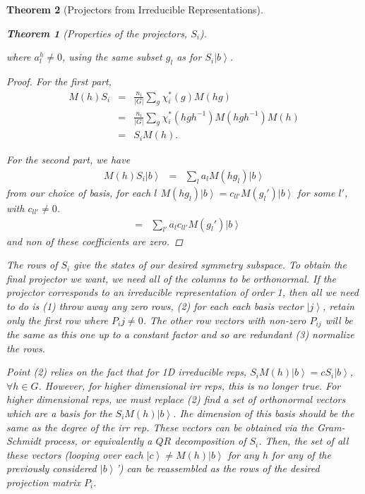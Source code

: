 \documentclass{article}
\newcommand{\ket}[1]{\left| #1 \right>} %
\newtheorem{theorem}{Theorem}[section]
\theoremstyle{definition}
\begin{document}
\begin{theorem}[Projectors from Irreducible Representations]
\begin{theorem}[Properties of the projectors, $S_i$]
\begin{enumerate}
where $a^h_l \neq 0$, using the same subset $g_l$ as for $S_i \ket{b}$.
\end{enumerate}
\end{theorem}
\begin{proof}

For the first part,
\begin{eqnarray}
M(h) S_i &=& \frac{n_i}{|G|} \sum_g \chi_i^*(g) M(hg)\\
&=& \frac{n_i}{|G|} \sum_g \chi_i^*(hgh^{-1}) M(hgh^{-1}) M(h)\\
&=& S_i M(h).
\end{eqnarray}

For the second part, we have
\begin{eqnarray}
M(h) S_i \ket{b} &=& \sum_l a_l M(h g_l) \ket{b}
\end{eqnarray}
from our choice of basis, for each $l$ $M(h g_l) \ket{b} = c_{ll'} M(g_l') \ket{b}$ for some $l'$, with $c_{ll'} \neq 0$.
\begin{eqnarray}
&=& \sum_{l'} a_l c_{ll'} M(g_l') \ket{b}
\end{eqnarray}
and non of these coefficients are zero.

\end{proof}

The rows of $S_i$ give the states of our desired symmetry subspace. To obtain the final projector we want, we need all of the columns to be orthonormal. If the projector corresponds to an irreducible representation of order 1, then all we need to do is (1) throw away any zero rows, (2) for each each basis vector $\ket{j}$, retain only the first row where $P_ij \neq 0$. The other row vectors with non-zero $P_{ij}$ will be the same as this one up to a constant factor and so are redundant (3) normalize the rows.

Point (2) relies on the fact that for 1D irreducible reps, $S_i M(h) \ket{b} = c S_i \ket{b}$, $\forall h \in G$. However, for higher dimensional irr reps, this is no longer true. For higher dimensional reps, we must replace (2) find a set of orthonormal vectors which are a basis for the $S_i M(h) \ket{b}$. Ihe dimension of this basis should be the same as the degree of the irr rep. These vectors can be obtained via the Gram-Schmidt process, or equivalently a $QR$ decomposition of $S_i$. Then, the set of all these vectors (looping over each $\ket{c} \neq M(h) \ket{b}$ for any $h$ for any of the previously considered $\ket{b}$') can be reassembled as the rows of the desired projection matrix $P_i$.


\end{theorem}
\end{document}

